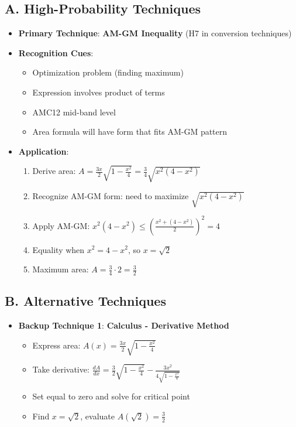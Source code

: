 \documentclass[12pt]{article}
\begin{document}
\begin{techniquesbox}
\subsection*{A. High-Probability Techniques}
\begin{itemize}[leftmargin=*]
    \item \textbf{Primary Technique}: \textbf{AM-GM Inequality} (H7 in conversion techniques)
    \item \textbf{Recognition Cues}: 
    \begin{itemize}
        \item Optimization problem (finding maximum)
        \item Expression involves product of terms
        \item AMC12 mid-band level
        \item Area formula will have form that fits AM-GM pattern
    \end{itemize}
    \item \textbf{Application}: 
    \begin{enumerate}
        \item Derive area: $A = \frac{3x}{2}\sqrt{1 - \frac{x^2}{4}} = \frac{3}{4}\sqrt{x^2(4-x^2)}$
        \item Recognize AM-GM form: need to maximize $\sqrt{x^2(4-x^2)}$
        \item Apply AM-GM: $x^2(4-x^2) \leq \left(\frac{x^2 + (4-x^2)}{2}\right)^2 = 4$
        \item Equality when $x^2 = 4-x^2$, so $x = \sqrt{2}$
        \item Maximum area: $A = \frac{3}{4} \cdot 2 = \frac{3}{2}$
    \end{enumerate}
\end{itemize}

\subsection*{B. Alternative Techniques}
\begin{itemize}[leftmargin=*]
    \item \textbf{Backup Technique 1}: \textbf{Calculus - Derivative Method}
    \begin{itemize}
        \item Express area: $A(x) = \frac{3x}{2}\sqrt{1 - \frac{x^2}{4}}$
        \item Take derivative: $\frac{dA}{dx} = \frac{3}{2}\sqrt{1-\frac{x^2}{4}} - \frac{3x^2}{4\sqrt{1-\frac{x^2}{4}}}$
        \item Set equal to zero and solve for critical point
        \item Find $x = \sqrt{2}$, evaluate $A(\sqrt{2}) = \frac{3}{2}$
    \end{itemize}
    

\end{itemize}
\end{techniquesbox}
\end{document}

